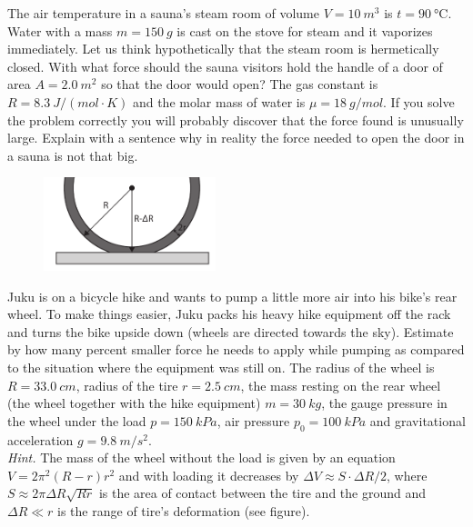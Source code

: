 \documentclass[11pt]{article}
\begin{document}

\probeng
The air temperature in a sauna’s steam room of volume $V=\SI{10}{m^3}$ is $t=\SI{90}{\degreeCelsius}$. Water with a mass $m=\SI{150}{g}$ is cast on the stove for steam and it vaporizes immediately. Let us think hypothetically that the steam room is hermetically closed. With what force should the sauna visitors hold the handle of a door of area $A=\SI{2,0}{m^2}$ so that the door would open? The gas constant is $R=\SI{8.3}{J \per (mol\!\cdot\! K)}$ and the molar mass of water is $\mu=\SI{18}{g\per mol}$. If you solve the problem correctly you will probably discover that the force found is unusually large. Explain with a sentence why in reality the force needed to open the door in a sauna is not that big.
\probend
\bigskip


\probeng
\begin{figure}
	\vspace{-15pt}
	\includegraphics[width=5cm]{2017-lahg-05-fig_rattakumm}
\end{figure}
Juku is on a bicycle hike and wants to pump a little more air into his bike’s rear wheel. To make things easier, Juku packs his heavy hike equipment off the rack and turns the bike upside down (wheels are directed towards the sky). Estimate by how many percent smaller force he needs to apply while pumping as compared to the situation where the equipment was still on. The radius of the wheel is $R=\SI{33.0}{cm}$, radius of the tire $r=\SI{2.5}{cm}$, the mass resting on the rear wheel (the wheel together with the hike equipment) $m=\SI{30}{kg}$, the gauge pressure in the wheel under the load $p=\SI{150}{kPa}$, air pressure $p_{0}=\SI{100}{kPa}$ and gravitational acceleration $g=\SI{9.8}{m/s^{2}}$.\\
\emph{Hint.} The mass of the wheel without the load is given by an equation $V=2\pi^{2}\left(R-r\right)r^{2}$ and with loading it decreases by $\Delta V\approx S\cdot\Delta R/2$, where $S\approx2\pi\Delta R\sqrt{Rr}$ is the area of contact between the tire and the ground and $\Delta R\ll r$ is the range of tire’s deformation (see figure).
\probend
\bigskip
\end{document}
